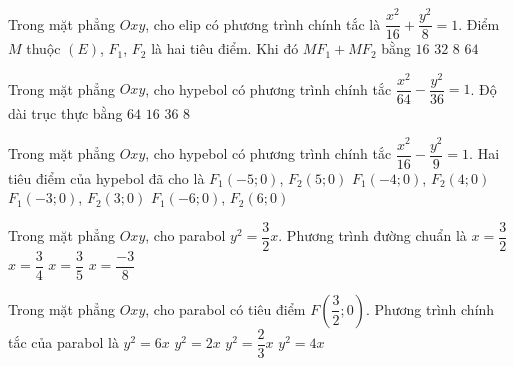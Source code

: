 \begin{ex}%
	Trong mặt phẳng $Oxy$, cho elip có phương trình chính tắc là $\dfrac{x^2}{16}+\dfrac{y^2}{8}=1$. Điểm $M$ thuộc $(E)$, $F_1$, $F_2$ là hai tiêu điểm. Khi đó $MF_1+MF_2$ bằng
	\choice
	{$16$}
	{$32$}
	{\True $8$}
	{$64$}
\end{ex}
\begin{ex}%
	Trong mặt phẳng $Oxy$, cho hypebol có phương trình chính tắc $\dfrac{x^2}{64}-\dfrac{y^2}{36}=1$. Độ dài trục thực bằng
	\choice
	{$64$}
	{\True $16$}
	{$36$}
	{$8$}
\end{ex}
\begin{ex}%
	Trong mặt phẳng $Oxy$, cho hypebol có phương trình chính tắc $\dfrac{x^2}{16}-\dfrac{y^2}{9}=1$. Hai tiêu điểm của hypebol đã cho là
	\choice
	{\True $F_1(-5;0)$, $F_2(5;0)$}
	{$F_1(-4;0)$, $F_2(4;0)$}
	{$F_1(-3;0)$, $F_2(3;0)$}
	{$F_1(-6;0)$, $F_2(6;0)$}
\end{ex}
\begin{ex}%
	Trong mặt phẳng $Oxy$, cho parabol $y^2=\dfrac{3}{2}x$. Phương trình đường chuẩn là
	\choice
	{$x=\dfrac{3}
	{2}$}
	{$x=\dfrac{3}
	{4}$}
	{$x=\dfrac{3}{5}$}
	{\True $x=\dfrac{-3}{8}$}
\end{ex}
\begin{ex}%
	Trong mặt phẳng $Oxy$, cho parabol có tiêu điểm $F\left(\dfrac{3}{2};0\right)$. Phương trình chính tắc của parabol là
	\choice
	{\True $y^2=6x$}
	{$y^2=2x$}
	{$y^2=\dfrac{2}
	{3}x$}
	{$y^2=4x$}
\end{ex}
